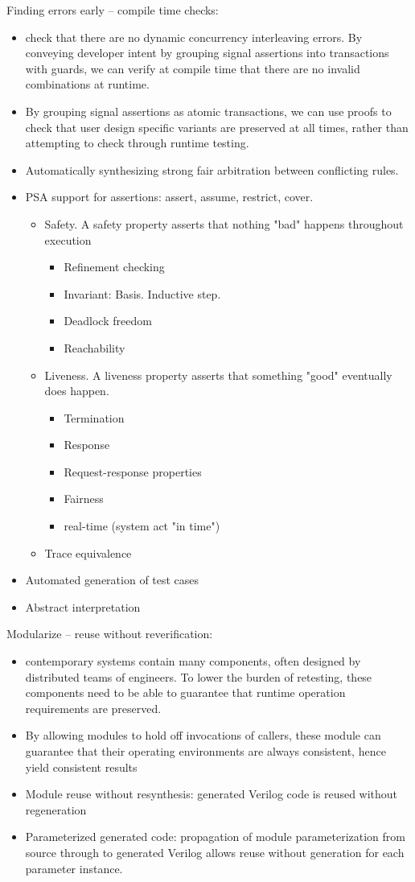 Finding errors early -- compile time checks:
\begin{itemize}
\item check that there are no dynamic concurrency interleaving errors.  By 
conveying developer intent by grouping
signal assertions into transactions with guards, we can verify at compile time
that there are no invalid combinations at runtime.
\item By grouping signal assertions as atomic transactions, we can use proofs
to check that user design specific variants are preserved at all times, rather
than attempting to check through runtime testing.
\item Automatically synthesizing strong fair arbitration between conflicting rules.
\item PSA support for assertions: assert, assume, restrict, cover.
\begin{itemize}
\item Safety. A safety property asserts that nothing "bad" happens throughout execution
\begin{itemize}
\item Refinement checking
\item Invariant:  Basis.  Inductive step.
\item Deadlock freedom
\item Reachability
\end{itemize}
\item Liveness. A liveness property asserts that something "good" eventually does happen.
\begin{itemize}
\item Termination
\item Response
\item Request-response properties
\item Fairness
\item real-time (system act "in time")
\end{itemize}
\item Trace equivalence
\end{itemize}
\item Automated generation of test cases
\item Abstract interpretation
\end{itemize}

Modularize -- reuse without reverification:
\begin{itemize}
\item contemporary systems contain many components,
often designed by distributed teams of engineers.  To lower the burden
of retesting, these components need to be able to guarantee that
runtime operation requirements are preserved.
\item By allowing modules to hold off invocations of callers, these module
can guarantee that their operating environments are always consistent, hence
yield consistent results
\item Module reuse without resynthesis: generated Verilog code is reused without regeneration
\item Parameterized generated code: propagation of module parameterization from
source through to generated Verilog allows reuse without generation for each parameter instance.
\end{itemize}

